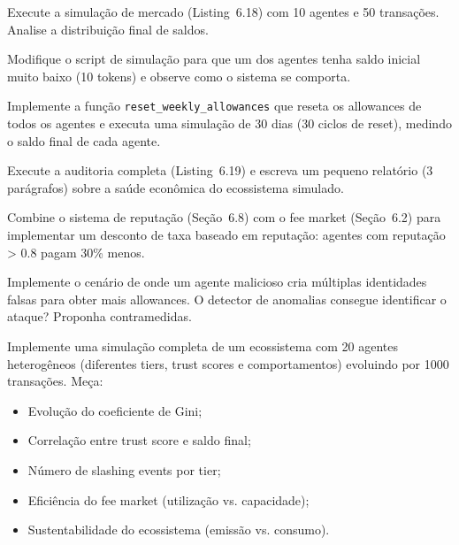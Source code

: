 \begin{exercicio}
Execute a simulação de mercado (Listing~6.18) com 10 agentes e
50 transações. Analise a distribuição final de saldos.
\end{exercicio}

\begin{exercicio}
Modifique o script de simulação para que um dos agentes tenha
saldo inicial muito baixo (10 tokens) e observe como o sistema
se comporta.
\end{exercicio}

\begin{exercicio}
Implemente a função \lstinline{reset_weekly_allowances} que
reseta os allowances de todos os agentes e executa uma simulação
de 30 dias (30 ciclos de reset), medindo o saldo final de cada
agente.
\end{exercicio}

\begin{exercicio}
Execute a auditoria completa (Listing~6.19) e escreva um
pequeno relatório (3 parágrafos) sobre a saúde econômica do
ecossistema simulado.
\end{exercicio}

\begin{exercicio}
Combine o sistema de reputação (Seção~6.8) com o fee market
(Seção~6.2) para implementar um desconto de taxa baseado em
reputação: agentes com reputação > 0.8 pagam 30\% menos.
\end{exercicio}

\begin{exercicio}
Implemente o cenário de  onde um agente
malicioso cria múltiplas identidades falsas para obter mais
allowances. O detector de anomalias consegue identificar o
ataque? Proponha contramedidas.
\end{exercicio}

\begin{exercicio}
Implemente uma simulação completa de um ecossistema com 20
agentes heterogêneos (diferentes tiers, trust scores e
comportamentos) evoluindo por 1000 transações. Meça:
\begin{itemize}
\item Evolução do coeficiente de Gini;
\item Correlação entre trust score e saldo final;
\item Número de slashing events por tier;
\item Eficiência do fee market (utilização vs. capacidade);
\item Sustentabilidade do ecossistema (emissão vs. consumo).
\end{itemize}
\end{exercicio}

